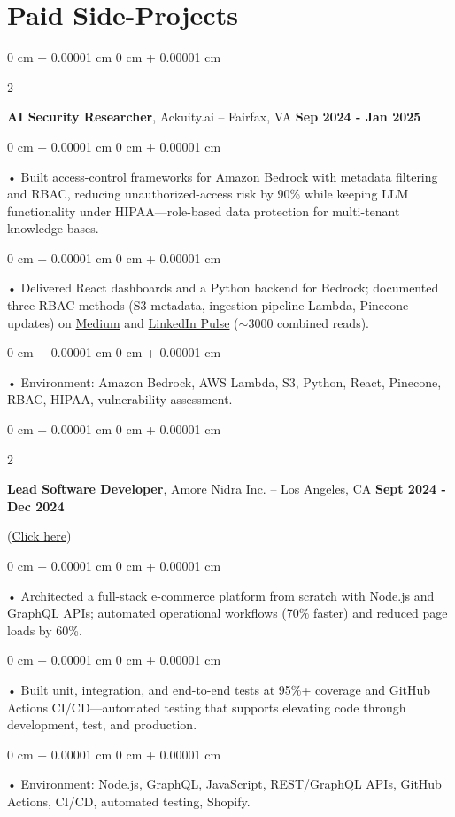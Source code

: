 \documentclass[10pt, letterpaper]{article}
\newenvironment{onecolentry}{
    \begin{adjustwidth}{
        0 cm + 0.00001 cm
    }{
        0 cm + 0.00001 cm
    }
}{
    \end{adjustwidth}
} %
\newenvironment{twocolentry}[2][]{
    \onecolentry
    \def\secondColumn{#2}
    \setcolumnwidth{\fill, 4.5 cm}
    \begin{paracol}{2}
}{
    \switchcolumn \raggedleft \secondColumn
    \end{paracol}
    \endonecolentry
} %
\begin{document}
    \section{Paid Side-Projects}
            \vspace{2 pt }
                    \begin{twocolentry}{
            \textbf{Sep 2024 - Jan 2025}
        }
            \textbf{AI Security Researcher}, Ackuity.ai -- Fairfax, VA\end{twocolentry}

        \begin{onecolentry}
             • Built access-control frameworks for Amazon Bedrock with metadata filtering and RBAC, reducing unauthorized-access risk by 90\% while keeping LLM functionality under HIPAA---role-based data protection for multi-tenant knowledge bases.
        \end{onecolentry}
        \begin{onecolentry}
             • Delivered React dashboards and a Python backend for Bedrock; documented three RBAC methods (S3 metadata, ingestion-pipeline Lambda, Pinecone updates) on \href{https://medium.com/@sreenikethaathreya/building-a-permission-aware-genai-application-on-amazon-bedrock-8fdc2410dd43}{Medium} and \href{https://www.linkedin.com/pulse/building-permission-aware-genai-application-amazon-bedrock-aathreya-g7nme/}{LinkedIn Pulse} ($\sim$3000 combined reads).
        \end{onecolentry}
        \begin{onecolentry}
             • Environment: Amazon Bedrock, AWS Lambda, S3, Python, React, Pinecone, RBAC, HIPAA, vulnerability assessment.
        \end{onecolentry}

        \vspace{0.4cm}
        \begin{twocolentry}{
            \textbf{Sept 2024 - Dec 2024}
        }
            \textbf{Lead Software Developer}, Amore Nidra Inc. -- Los Angeles, CA\end{twocolentry}(\href{https://amorenidra.com}{Click here})

        \begin{onecolentry}
             • Architected a full-stack e-commerce platform from scratch with Node.js and GraphQL APIs; automated operational workflows (70\% faster) and reduced page loads by 60\%.
        \end{onecolentry}
        \begin{onecolentry}
             • Built unit, integration, and end-to-end tests at 95\%+ coverage and GitHub Actions CI/CD---automated testing that supports elevating code through development, test, and production.
        \end{onecolentry}
        \begin{onecolentry}
             • Environment: Node.js, GraphQL, JavaScript, REST/GraphQL APIs, GitHub Actions, CI/CD, automated testing, Shopify.
        \end{onecolentry}
\end{document}
